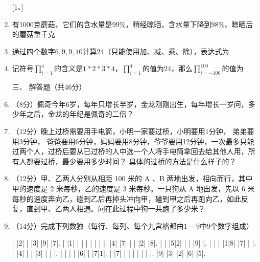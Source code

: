\documentclass[12pt,landscape,UTF8,onecolumn]{ctexart}
\begin{document}
\begin{spacing}{1.3}
\begin{enumerate} [1、]
      \item 有1000克蘑菇，它们的含水量是99\%，稍经晾晒，含水量下降到98\%，晾晒后的蘑菇重\tk{}千克

      \item 通过四个数字$6,9,9,10$计算24（只能使用加、减、乘、除），表达式为\tk{}

      \item 记符号$\prod_{i=1}^4$的含义是$1*2*3*4$，$\prod_{i=1}^4$的值为$24$，那么$\prod_{i=-100}^{100}$的值为\tk{}

      \item[\heiti 三、] {\heiti 解答题（共46分）}

      \item （8分）佩奇今年6岁，每年只增长半岁，金龙刚刚出生，每年增长一岁问，多少年之后，金龙的年纪是佩奇的二倍？

      \item （12分）晚上过桥需要用手电筒，小明一家要过桥，小明要用1分钟， 弟弟要用3分钟， 爸爸要用6分钟，妈妈要用8分钟，爷爷要用12分钟，一次最多只能过两个人，过桥后要从已过桥的人中选一个人将手电筒拿回去给其他人用，所有人都要过桥，最少要用多少时间？ 具体的过桥的方法是什么样子的？

      \item （12分）甲、乙两人分别从相距 100 米的 A 、B 两地出发，相向而行，其中甲的速度是 2 米每秒，乙的速度是 3 米每秒。一只狗从 A 地出发，先以 6 米每秒的速度奔向乙，碰到乙后再掉头冲向甲，碰到甲之后再跑向乙，如此反复，直到甲、乙两人相遇。问在此过程中狗一共跑了多少米？ 

      \item （14分）完成下列数独（每行、每列、每个九宫格都由$1-9$中9个数字组成）
        \begin{sudoku}
          | |2| | |3| |9| |7|.
          | |1| | | | | | | |.
          |4| |7| | | |2| |8|.
          | | |5|2| | | |9| |.
          | | | |1|8| |7| | |.
          | |4| | | |3| | | |.
          | | | | |6| | |7|1|.
          | |7| | | | | | | |.
          |9| |3| |2| |6| |5|.
        \end{sudoku}

    \end{enumerate} 
  \end{spacing}
\end{document}
